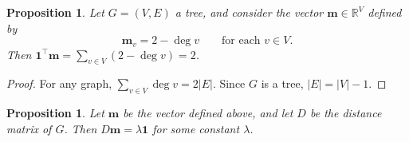 \documentclass{amsart}
\newtheorem{prop}[thm]{Proposition}
\theoremstyle{definition}
\newcommand{\RR}{\mathbb{R}}
\newcommand{\bone}{\mathbf{1}}
\newcommand{\boldm}{\mathbf{m}}
\newcommand{\tr}{\intercal}
\begin{document}
\begin{prop}
Let $G = (V,E)$ a tree, and consider the vector $\boldm \in \RR^V$
defined by 
\begin{equation}
\boldm_v = 2 - \deg v
\qquad\text{for each }v\in V.
\end{equation}
Then $\mathbf{1}^\tr \boldm = \sum_{v \in V} (2-\deg v) = 2$.
\end{prop}
\begin{proof}
For any graph, $\sum_{v\in V} \deg v = 2 |E|$.
Since $G$ is a tree, $|E| = |V|-1$.
\end{proof}

\begin{prop}
\label{prop:m-distance-warmup}
Let $\boldm$ be the vector defined above,
and let $D$ be the distance matrix of $G$.
Then $D \boldm = \lambda \bone$
for some constant $\lambda$.
\end{prop}
\end{document}
